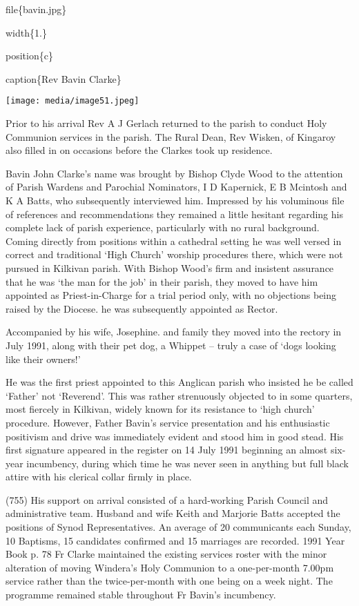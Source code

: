 file\{bavin.jpg\}

width\{1.\}

position\{c\}

caption\{Rev Bavin Clarke\}

\texttt{[image: media/image51.jpeg]}

Prior to his arrival Rev A J Gerlach returned to the parish to conduct Holy Communion services in the parish. The Rural Dean, Rev Wisken, of Kingaroy also filled in on occasions before the Clarkes took up residence.

Bavin John Clarke's name was brought by Bishop Clyde Wood to the attention of Parish Wardens and Parochial Nominators, I D Kapernick, E B Mcintosh and K A Batts, who subsequently interviewed him. Impressed by his voluminous file of references and recommendations they remained a little hesitant regarding his complete lack of parish experience, particularly with no rural background. Coming directly from positions within a cathedral setting he was well versed in correct and traditional `High Church' worship procedures there, which were not pursued in Kilkivan parish. With Bishop Wood's firm and insistent assurance that he was `the man for the job' in their parish, they moved to have him appointed as Priest-in-Charge for a trial period only, with no objections being raised by the Diocese. he was subsequently appointed as Rector.

Accompanied by his wife, Josephine. and family they moved into the rectory in July 1991, along with their pet dog, a Whippet -- truly a case of `dogs looking like their owners!'

He was the first priest appointed to this Anglican parish who insisted he be called `Father' not `Reverend'. This was rather strenuously objected to in some quarters, most fiercely in Kilkivan, widely known for its resistance to `high church' procedure. However, Father Bavin's service presentation and his enthusiastic positivism and drive was immediately evident and stood him in good stead. His first signature appeared in the register on 14 July 1991 beginning an almost six-year incumbency, during which time he was never seen in anything but full black attire with his clerical collar firmly in place.

(755) His support on arrival consisted of a hard-working Parish Council and administrative team. Husband and wife Keith and Marjorie Batts accepted the positions of Synod Representatives. An average of 20 communicants each Sunday, 10 Baptisms, 15 candidates confirmed and 15 marriages are recorded. 1991 Year Book p. 78 Fr Clarke maintained the existing services roster with the minor alteration of moving Windera's Holy Communion to a one-per-month 7.00pm service rather than the twice-per-month with one being on a week night. The programme remained stable throughout Fr Bavin's incumbency.

